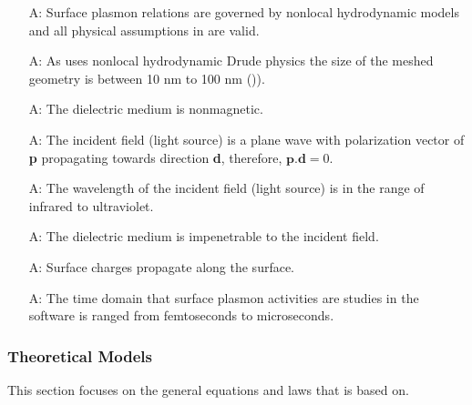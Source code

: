 \documentclass[12pt]{article}
\newcounter{assumpnum} %
\begin{document}
\begin{itemize}

\item[A\refstepcounter{assumpnum}\theassumpnum \label{A_nonlocal}:]
Surface plasmon relations are governed by nonlocal hydrodynamic models and all physical assumptions in \cite{hiremath2012numerical} are valid.

\item[A\refstepcounter{assumpnum}\theassumpnum \label{A_size}:] As \progname{} uses nonlocal hydrodynamic Drude physics the size of the meshed geometry is between 10 nm to 100 nm (\cite{hiremath2012numerical})). 

\item[A\refstepcounter{assumpnum}\theassumpnum \label{A_nonmag}:] The dielectric medium is nonmagnetic. 

\item[A\refstepcounter{assumpnum}\theassumpnum \label{A_pd}:]
The incident field (light source) is a plane wave with polarization vector of \textbf{p} propagating towards direction \textbf{d}, therefore, $\textbf{p}.\textbf{d} = 0$.

\item[A\refstepcounter{assumpnum}\theassumpnum \label{A_wl}:]
The wavelength of the incident field (light source) is in the range of infrared to ultraviolet.

\item[A\refstepcounter{assumpnum}\theassumpnum \label{A_impenetrable}:] The dielectric medium is impenetrable to the incident field. 	

\item[A\refstepcounter{assumpnum}\theassumpnum \label{A_leakage}:]
Surface charges propagate along the surface.

\item[A\refstepcounter{assumpnum}\theassumpnum \label{A_leakage}:]
The time domain that surface plasmon activities are studies in the software is ranged from femtoseconds to microseconds.


\end{itemize}

\subsubsection{Theoretical Models}\label{sec_theoretical}

This section focuses on the general equations and laws that \progname{} is based
on.  
\end{document}

